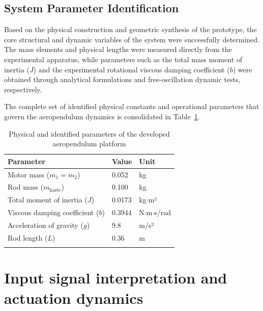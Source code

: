 \documentclass[pdflatex,sn-mathphys-num,iicol]{sn-jnl}
\theoremstyle{thmstyleone}%
\theoremstyle{thmstyletwo}%
\theoremstyle{thmstylethree}%
\begin{document}
\subsection{System Parameter Identification}
\label{sub:parameters}

Based on the physical construction and geometric synthesis of the prototype, the core structural and dynamic variables of the system were successfully determined. The mass elements and physical lengths were measured directly from the experimental apparatus, while parameters such as the total mass moment of inertia ($J$) and the experimental rotational viscous damping coefficient ($b$) were obtained through analytical formulations and free-oscillation dynamic tests, respectively. 

The complete set of identified physical constants and operational parameters that govern the aeropendulum dynamics is consolidated in Table~\ref{tab:system_parameters}.

\begin{table}[h]
\caption{Physical and identified parameters of the developed aeropendulum platform}\label{tab:system_parameters}%
\begin{center}
\begin{minipage}{\columnwidth}
\footnotesize %
\begin{tabular*}{\columnwidth}{@{\extracolsep{\fill}}@{}lll@{}}
\toprule
\textbf{Parameter} & \textbf{Value} & \textbf{Unit} \\
\midrule
Motor mass ($m_1 = m_2$) & 0.052 & kg \\
Rod mass ($m_{\text{haste}}$) & 0.100 & kg \\
Total moment of inertia ($J$) & 0.0173 & kg$\cdot$m² \\
Viscous damping coefficient ($b$) & 0.3944 & N$\cdot$m$\cdot$s/rad \\
Acceleration of gravity ($g$) & 9.8 & m/s² \\
Rod length ($L$) & 0.36 & m \\
\botrule        
\end{tabular*}
\end{minipage}
\end{center}
\end{table}


\section{Input signal interpretation and actuation dynamics}\label{sec4}
\end{document}
